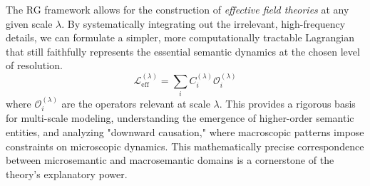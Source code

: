The RG framework allows for the construction of \textit{effective field theories} at any given scale \(\lambda\). By systematically integrating out the irrelevant, high-frequency details, we can formulate a simpler, more computationally tractable Lagrangian that still faithfully represents the essential semantic dynamics at the chosen level of resolution.
\begin{equation}
\mathcal{L}_{\mathrm{eff}}^{(\lambda)} = \sum_{i} C_{i}^{(\lambda)} \mathcal{O}_{i}^{(\lambda)}
\end{equation}
where \(\mathcal{O}_{i}^{(\lambda)}\) are the operators relevant at scale \(\lambda\). This provides a rigorous basis for multi-scale modeling, understanding the emergence of higher-order semantic entities, and analyzing "downward causation," where macroscopic patterns impose constraints on microscopic dynamics. This mathematically precise correspondence between microsemantic and macrosemantic domains is a cornerstone of the theory's explanatory power. 